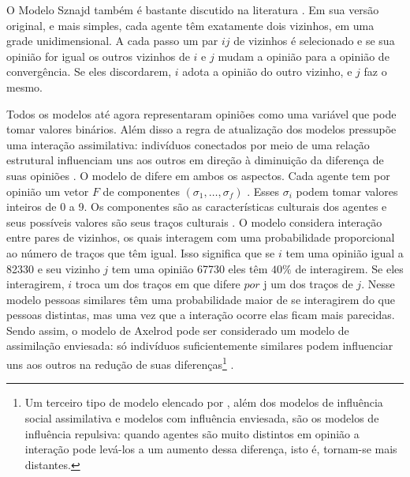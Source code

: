   O Modelo Sznajd também é bastante discutido na literatura
  \cite{sznajd2000opinion, sirbu2017opinion,castellano2012social}. Em sua versão
  original, e mais simples, cada agente têm exatamente dois vizinhos, em uma
  grade unidimensional. A cada passo um par $ij$ de vizinhos é selecionado e se
  sua opinião for igual os outros vizinhos de \(i\) e \(j\) mudam a opinião para
  a opinião de convergência. Se eles discordarem, \(i\) adota a opinião do outro
  vizinho, e \(j\) faz o mesmo.

  Todos os modelos até agora representaram opiniões como uma variável que pode
  tomar valores binários. Além disso a regra de atualização dos modelos
  pressupõe uma interação assimilativa: indivíduos conectados por meio de uma
  relação estrutural influenciam uns aos outros em direção à diminuição da
  diferença de suas opiniões \cite{flache2017}. O modelo de
   difere em ambos os aspectos. Cada agente
  tem por opinião um vetor $F$ de componentes $(\sigma_1 , \ldots, \sigma_f)$
  \cite{klemm2003role}. Esses $\sigma_i$ podem tomar valores inteiros de 0 a 9. Os
  componentes são as características culturais dos agentes e seus possíveis
  valores são seus traços culturais \cite{gomes2014}. O modelo considera
  interação entre pares de vizinhos, os quais interagem com uma probabilidade
  proporcional ao número de traços que têm igual. Isso significa que se \(i\)
  tem uma opinião igual a 82330 e seu vizinho \(j\) tem uma opinião 67730 eles
  têm \(40 \%\) de interagirem. Se eles interagirem, \(i\) troca um dos traços
  em que difere \(por\) j um dos traços de \(j\)\cite{axelrod1997dissemination}.
  Nesse modelo pessoas similares têm uma probabilidade maior de se interagirem
  do que pessoas distintas, mas uma vez que a interação ocorre elas ficam mais
  parecidas. Sendo assim, o modelo de Axelrod pode ser considerado um modelo de
  assimilação enviesada: só indivíduos suficientemente similares podem
  influenciar uns aos outros na redução de suas diferenças\footnote{Um terceiro
    tipo de modelo elencado por , além dos modelos de
    influência social assimilativa e modelos com influência enviesada, são os
    modelos de influência repulsiva: quando agentes são muito distintos em
    opinião a interação pode levá-los a um aumento dessa diferença, isto é,
    tornam-se mais distantes.} \cite{flache2017}.


